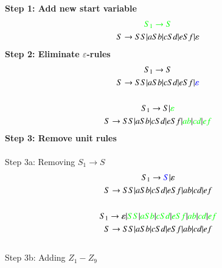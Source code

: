 \documentclass[12pt,letterpaper]{article}
\begin{document}
		\textbf{Step 1: Add new start variable}
		\begin{gather*}
			\textcolor{green}{S_1\rightarrow S}\\
			S \rightarrow SS\arrowvert aSb\arrowvert cSd\arrowvert eSf\arrowvert \varepsilon
		\end{gather*}
		\textbf{Step 2: Eliminate $\varepsilon$-rules}
		\begin{gather*}
			S_1\rightarrow S\\
			S \rightarrow SS\arrowvert aSb\arrowvert cSd\arrowvert eSf\arrowvert \textcolor{blue}{\varepsilon}\\
			\\S_1\rightarrow S\arrowvert \textcolor{green}{\varepsilon}\\
			S \rightarrow SS\arrowvert aSb\arrowvert cSd\arrowvert eSf\arrowvert \textcolor{green}{ab}\arrowvert \textcolor{green}{cd}\arrowvert \textcolor{green}{ef}
		\end{gather*}
		\textbf{Step 3: Remove unit rules}\\
		\\Step 3a: Removing $S_1\rightarrow S$
		\begin{gather*}
			S_1\rightarrow \textcolor{blue}{S}\arrowvert \varepsilon\\
			S \rightarrow SS\arrowvert aSb\arrowvert cSd\arrowvert eSf\arrowvert ab\arrowvert cd\arrowvert ef\\
			\\S_1\rightarrow \varepsilon\arrowvert \textcolor{green}{SS}\arrowvert \textcolor{green}{aSb}\arrowvert \textcolor{green}{cSd}\arrowvert \textcolor{green}{eSf}\arrowvert \textcolor{green}{ab}\arrowvert \textcolor{green}{cd}\arrowvert \textcolor{green}{ef}\\
			S \rightarrow SS\arrowvert aSb\arrowvert cSd\arrowvert eSf\arrowvert ab\arrowvert cd\arrowvert ef
		\end{gather*}
		\\Step 3b: Adding $Z_1-Z_9$
\end{document}
